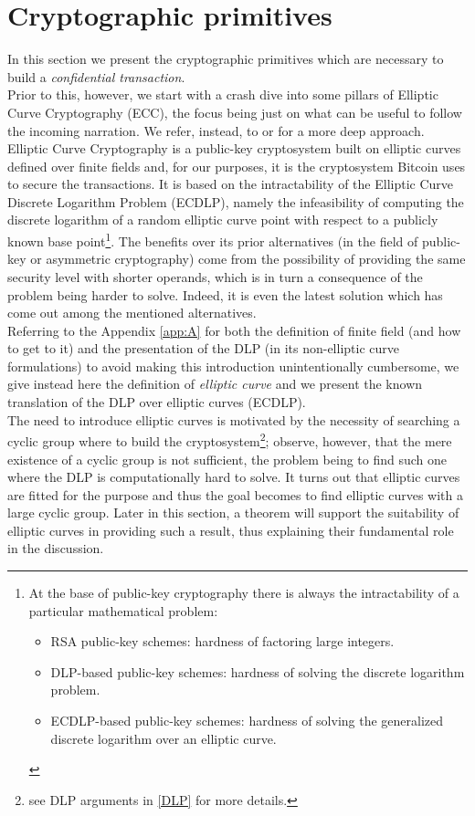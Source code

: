 \chapter{Cryptographic primitives}
\label{chpr:crypto_primitives}
In this section we present the cryptographic primitives which are necessary to build a \textit{confidential transaction}.\\
Prior to this, however, we start with a crash dive into some pillars of Elliptic Curve Cryptography (ECC), the focus being just on what can be useful to follow the incoming narration. We refer, instead, to \cite{Sec} or \cite{UnderstandingCrypto} for a more deep approach.\\
Elliptic Curve Cryptography is a public-key cryptosystem built on elliptic curves defined over finite fields and, for our purposes, it is the cryptosystem Bitcoin uses to secure the transactions. It is based on the intractability of the Elliptic Curve Discrete Logarithm Problem (ECDLP), namely the infeasibility of computing the discrete logarithm of a random elliptic curve point with respect to a publicly known base point\footnote{At the base of public-key cryptography there is always the intractability of a particular mathematical problem: \begin{itemize} \item RSA public-key schemes: hardness of factoring large integers. \item DLP-based public-key schemes: hardness of solving the discrete logarithm problem. \item ECDLP-based public-key schemes: hardness of solving the generalized discrete logarithm over an elliptic curve. \end{itemize}}. The benefits over its prior alternatives (in the field of public-key or asymmetric cryptography) come from the possibility of providing the same security level with shorter operands, which is in turn a consequence of the problem being harder to solve. Indeed, it is even the latest solution which has come out among the mentioned alternatives.\\
Referring to the Appendix \ref{app:A} for both the definition of finite field (and how to get to it) and the presentation of the DLP (in its non-elliptic curve formulations) to avoid making this introduction unintentionally cumbersome, we give instead here the definition of \textit{elliptic curve} and we present the known translation of the DLP over elliptic curves (ECDLP).\\ 
The need to introduce elliptic curves is motivated by the necessity of searching a cyclic group where to build the cryptosystem\footnote{see DLP arguments in \ref{DLP} for more details.}; observe, however, that the mere existence of a cyclic group is not sufficient, the problem being to find such one where the DLP is computationally hard to solve. It turns out that elliptic curves are fitted for the purpose and thus the goal becomes to find elliptic curves with a large cyclic group. Later in this section, a theorem will support the suitability of elliptic curves in providing such a result, thus explaining their fundamental role in the discussion.\\
